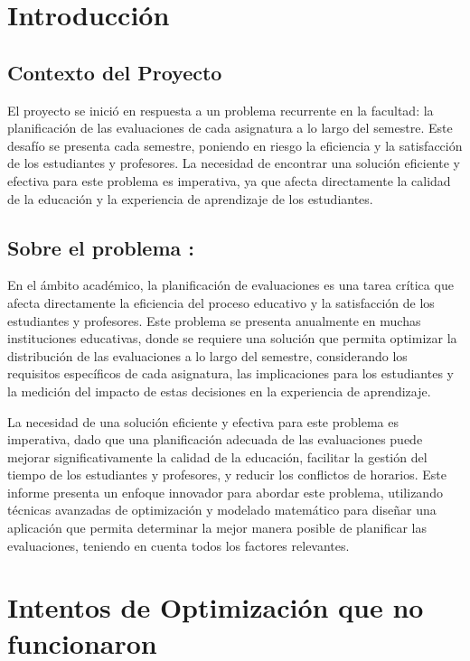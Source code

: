 \documentclass{article}
\begin{document}
\section{Introducción}

\subsection{Contexto del Proyecto}

El proyecto se inició en respuesta a un problema recurrente en la facultad: la planificación de las evaluaciones de cada asignatura a lo largo del semestre. Este desafío se presenta cada semestre, poniendo en riesgo la eficiencia y la satisfacción de los estudiantes y profesores. La necesidad de encontrar una solución eficiente y efectiva para este problema es imperativa, ya que afecta directamente la calidad de la educación y la experiencia de aprendizaje de los estudiantes.
\subsection{Sobre el problema :}

En el ámbito académico, la planificación de evaluaciones es una tarea crítica que afecta directamente la eficiencia del proceso educativo y la satisfacción de los estudiantes y profesores. Este problema se presenta anualmente en muchas instituciones educativas, donde se requiere una solución que permita optimizar la distribución de las evaluaciones a lo largo del semestre, considerando los requisitos específicos de cada asignatura, las implicaciones para los estudiantes y la medición del impacto de estas decisiones en la experiencia de aprendizaje.

La necesidad de una solución eficiente y efectiva para este problema es imperativa, dado que una planificación adecuada de las evaluaciones puede mejorar significativamente la calidad de la educación, facilitar la gestión del tiempo de los estudiantes y profesores, y reducir los conflictos de horarios. Este informe presenta un enfoque innovador para abordar este problema, utilizando técnicas avanzadas de optimización y modelado matemático para diseñar una aplicación que permita determinar la mejor manera posible de planificar las evaluaciones, teniendo en cuenta todos los factores relevantes.
\section{Intentos de Optimización que no funcionaron}
\end{document}
